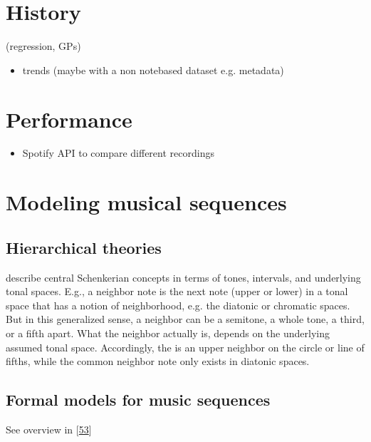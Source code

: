 \documentclass[letterpaper,10pt,english]{sphinxmanual}
\begin{document}
\section{History}
\label{\detokenize{6_advanced:history}}
\sphinxAtStartPar
(regression, GPs)
\begin{itemize}
\item {} 
\sphinxAtStartPar
trends (maybe with a non note\sphinxhyphen{}based dataset e.g. metadata)

\end{itemize}


\section{Performance}
\label{\detokenize{6_advanced:performance}}\begin{itemize}
\item {} 
\sphinxAtStartPar
Spotify API to compare different recordings

\end{itemize}


\section{Modeling musical sequences}
\label{\detokenize{6_advanced:modeling-musical-sequences}}

\subsection{Hierarchical theories}
\label{\detokenize{6_advanced:hierarchical-theories}}
\sphinxAtStartPar
describe central Schenkerian concepts in terms
of tones, intervals, and underlying tonal spaces.
E.g., a neighbor note is the next note (upper or lower)
in a tonal space that has a notion of neighborhood, e.g.
the diatonic or chromatic spaces. But in this generalized sense,
a neighbor can be a semitone, a whole tone, a third, or a fifth
apart. What the neighbor actually is, depends on the underlying
assumed tonal space. Accordingly, the  is an upper
neighbor on the circle or line of fifths, while the common neighbor note
only exists in diatonic spaces.


\subsection{Formal models for music sequences}
\label{\detokenize{6_advanced:formal-models-for-music-sequences}}
\sphinxAtStartPar
See overview in {[}\hyperlink{cite.8_bibliography:id17}{53}{]}
\end{document}
